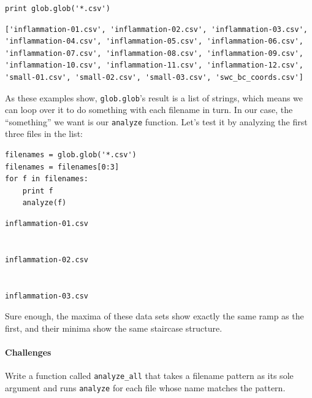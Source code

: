 \documentclass{book}
\begin{document}
\begin{verbatim}
print glob.glob('*.csv')
\end{verbatim}

\begin{verbatim}
['inflammation-01.csv', 'inflammation-02.csv', 'inflammation-03.csv', 'inflammation-04.csv', 'inflammation-05.csv', 'inflammation-06.csv', 'inflammation-07.csv', 'inflammation-08.csv', 'inflammation-09.csv', 'inflammation-10.csv', 'inflammation-11.csv', 'inflammation-12.csv', 'small-01.csv', 'small-02.csv', 'small-03.csv', 'swc_bc_coords.csv']
\end{verbatim}

As these examples show, \texttt{glob.glob}'s result is a list of
strings, which means we can loop over it to do something with each
filename in turn. In our case, the ``something'' we want is our
\texttt{analyze} function. Let's test it by analyzing the first three
files in the list:

\begin{verbatim}
filenames = glob.glob('*.csv')
filenames = filenames[0:3]
for f in filenames:
    print f
    analyze(f)
\end{verbatim}

\begin{verbatim}
inflammation-01.csv


inflammation-02.csv


inflammation-03.csv

\end{verbatim}

Sure enough, the maxima of these data sets show exactly the same ramp as
the first, and their minima show the same staircase structure.

\mbox{}\paragraph{Challenges}

\begin{swcenumerate}
\item
  Write a function called \texttt{analyze\_all} that takes a filename
  pattern as its sole argument and runs \texttt{analyze} for each file
  whose name matches the pattern.
\end{swcenumerate}
\end{document}
